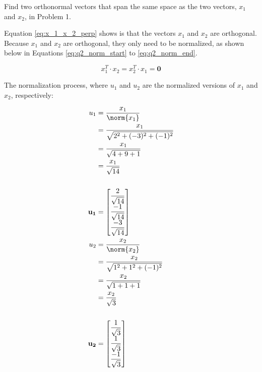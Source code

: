 \begin{question}{2} %
Find two orthonormal vectors that span the same space as the two vectors, $x_1$ 
and $x_2$, in Problem 1.
\end{question}

Equation \ref{eq:x_1_x_2_perp} shows is that the vectors $x_1$ and $x_2$ are
orthogonal. Because $x_1$ and $x_2$ are orthogonal, they only need to be 
normalized, as shown below in Equations \ref{eq:q2_norm_start} to
\ref{eq:q2_norm_end}.

\begin{equation} \label{eq:x_1_x_2_perp}
  x_1^T \cdot x_2 = x_2^T \cdot x_1 = \mathbf{0}
\end{equation}

The normalization process, where $u_1$ and $u_2$ are the normalized versions of
$x_1$ and $x_2$, respectively:

\begin{align}
  u_1 &= \dfrac{x_1}{\norm{x_1}}\label{eq:q2_norm_start} \\
      &= \dfrac{x_1}{\sqrt{2^2 + (-3)^2 + (-1)^2}} \nonumber \\
      &= \dfrac{x_1}{\sqrt{4 + 9 + 1}} \nonumber \\
      &= \dfrac{x_1}{\sqrt{14}} \nonumber \\ \nonumber \\
\mathbf{u_1} &= \begin{bmatrix} 
          \dfrac{2}{\sqrt{14}} \nonumber \\
          \dfrac{-1}{\sqrt{14}} \nonumber \\
          \dfrac{-3}{\sqrt{14}}
         \end{bmatrix} \nonumber \\
  u_2 &= \dfrac{x_2}{\norm{x_2}} \nonumber \\
      &= \dfrac{x_2}{\sqrt{1^2 + 1^2 + (-1)^2}} \nonumber \\
      &= \dfrac{x_2}{\sqrt{1 + 1 + 1}} \nonumber \\
      &= \dfrac{x_2}{\sqrt{3}} \nonumber \\ \nonumber \\
\mathbf{u_2} &= \begin{bmatrix} 
          \dfrac{1}{\sqrt{3}} \nonumber \\
          \dfrac{1}{\sqrt{3}} \nonumber \\
          \dfrac{-1}{\sqrt{3}}
         \end{bmatrix} \\ \label{eq:q2_norm_end}
\end{align}





